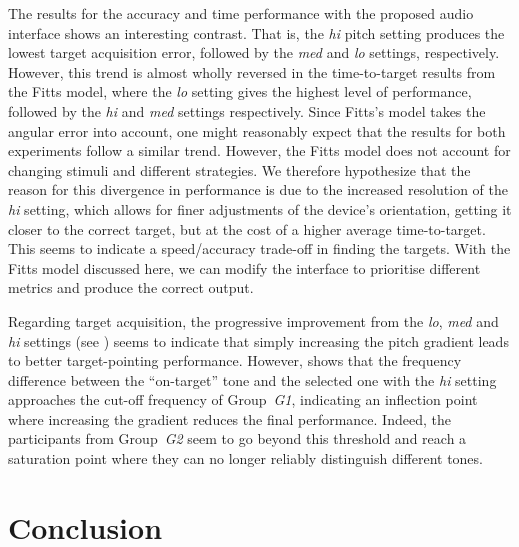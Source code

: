 \documentclass[acmsmall]{acmart}
\begin{document}
The results for the accuracy and time performance with the proposed audio interface shows an interesting contrast.
That is, the \textit{hi} pitch setting produces the lowest target acquisition error, followed by the \textit{med} and \textit{lo} settings, respectively. 
However, this trend is almost wholly reversed in the time-to-target results from the Fitts model, where the \textit{lo} setting gives the highest level of performance, followed by the \textit{hi} and \textit{med} settings respectively. 
Since Fitts's model takes the angular error into account, one might reasonably expect that the results for both experiments follow a similar trend. 
However, the Fitts model does not account for changing stimuli and different strategies.
We therefore hypothesize that the reason for this divergence in performance is due to the increased resolution of the \textit{hi} setting, which allows for finer adjustments of the device's orientation, getting it closer to the correct target, but at the cost of a higher average time-to-target. 
This seems to indicate a speed/accuracy trade-off in finding the targets.
With the Fitts model discussed here, we can modify the interface to prioritise different metrics and produce the correct output. 

Regarding target acquisition, the progressive improvement from the \textit{lo}, \textit{med} and \textit{hi} settings (see ) seems to indicate that simply increasing the pitch gradient leads to better target-pointing performance.
However,  shows that the frequency difference between the ``on-target'' tone and the selected one with the \textit{hi} setting approaches the cut-off frequency of Group~\textit{G1}, indicating an inflection point where increasing the gradient reduces the final performance. 
Indeed, the participants from Group~\textit{G2} seem to go beyond this threshold and reach a saturation point where they can no longer reliably distinguish different tones.  

\section{Conclusion}\label{sec:conclusion}
\end{document}
